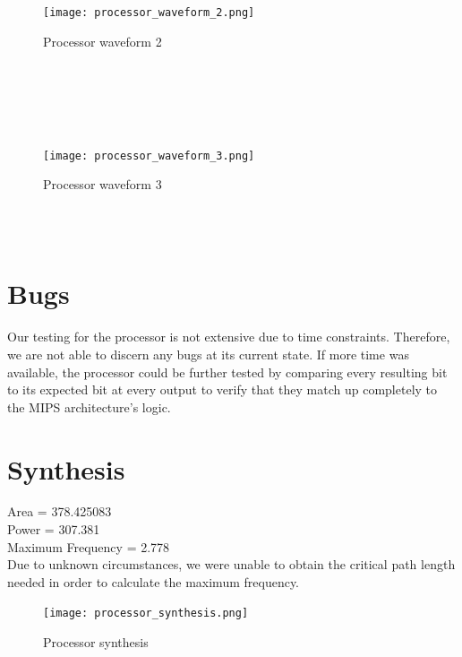 \documentclass{article}
\begin{document}
\\ \\
\begin{figure}[!ht]
	\centering
		\texttt{[image: processor\_waveform\_2.png]}
		\caption{Processor waveform 2}
\end{figure}
\\ \\

\\ \\
\begin{figure}[!ht]
	\centering
		\texttt{[image: processor\_waveform\_3.png]}
		\caption{Processor waveform 3}
\end{figure}
\\ \\
 
\section{Bugs}
Our testing for the processor is not extensive due to time constraints. Therefore, we are not able to discern any bugs at its current state. If more time was available, the processor could be further tested by comparing every resulting bit to its expected bit at every output to verify that they match up completely to the MIPS architecture's logic.

\section{Synthesis}
Area = 378.425083\\
Power = 307.381\\
Maximum Frequency = 2.778\\

Due to unknown circumstances, we were unable to obtain the critical path length needed in order to calculate the maximum frequency.

\begin{figure}[!ht]
	\centering
		\texttt{[image: processor\_synthesis.png]}
		\caption{Processor synthesis}
\end{figure}
\\ \\
\end{document}
